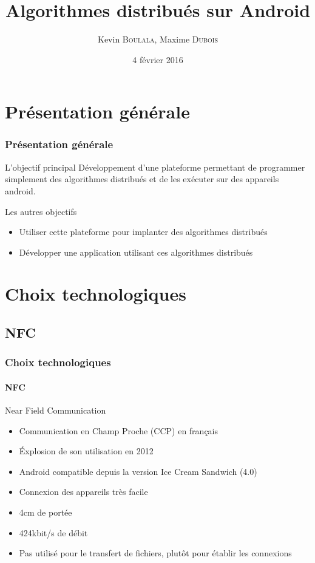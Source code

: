 \documentclass{beamer}
\title{Algorithmes distribués sur Android}
\author{Kevin \textsc{Boulala}, Maxime \textsc{Dubois}}
\institute{Université de Franche Comté}
\date{4 février 2016}
\begin{document}
  \begin{frame}
    \titlepage
  \end{frame}

  \begin{frame}
    \setcounter{tocdepth}{1}
	  \tableofcontents[]
  \end{frame}
  
  \section{Présentation générale}
  \begin{frame}
    \frametitle{Présentation générale}
    \begin{block}{L'objectif principal}
      Développement d'une plateforme permettant de programmer simplement des algorithmes distribués et de les exécuter sur des appareils android.
    \end{block}
    \begin{block}{Les autres objectifs}
      \begin{itemize}
        \item Utiliser cette plateforme pour implanter des algorithmes distribués
        \item Développer une application utilisant ces algorithmes distribués
      \end{itemize}
    \end{block}
  \end{frame}
  
  \section{Choix technologiques}
  \begin{frame}
    \setcounter{tocdepth}{2}
	  \tableofcontents[currentsection]
  \end{frame}
    \subsection{NFC}
    \begin{frame}
      \frametitle{Choix technologiques}
      \framesubtitle{NFC}
      \begin{block}{Near Field Communication}
        \begin{itemize}
          \item Communication en Champ Proche (CCP) en français
          \item Éxplosion de son utilisation en 2012
          \item Android compatible depuis la version Ice Cream Sandwich (4.0)
          \item Connexion des appareils très facile
          \item 4cm de portée
          \item 424kbit/s de débit
          \item Pas utilisé pour le transfert de fichiers, plutôt pour établir les connexions
        \end{itemize}
      \end{block}
    \end{frame}
\end{document}
